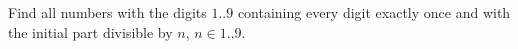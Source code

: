 Find all numbers with the digits $1..9$ containing every digit exactly once and with the initial part divisible by $n$, $n \in 1..9$.
